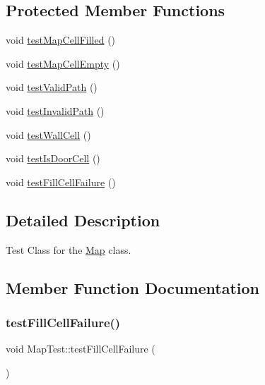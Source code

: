 \subsection*{Protected Member Functions}
\begin{DoxyCompactItemize}
\item 
void \hyperlink{classMapTest_a07e1aa96435351d15809b880ff7a7efb}{test\+Map\+Cell\+Filled} ()
\item 
void \hyperlink{classMapTest_a83bb3473f74089996c7f6bee8d59a97c}{test\+Map\+Cell\+Empty} ()
\item 
void \hyperlink{classMapTest_ae7a28d196c97101aa248a326af2a3f5b}{test\+Valid\+Path} ()
\item 
void \hyperlink{classMapTest_ad8823027d386c8d25f378d02adad120d}{test\+Invalid\+Path} ()
\item 
void \hyperlink{classMapTest_a577057c71af12efac9f1d6878bf85d01}{test\+Wall\+Cell} ()
\item 
void \hyperlink{classMapTest_a87e123f3f250492e1c444f0a3c8338b5}{test\+Is\+Door\+Cell} ()
\item 
void \hyperlink{classMapTest_a26099a50a62eec50694dba6e37bdfe22}{test\+Fill\+Cell\+Failure} ()
\end{DoxyCompactItemize}


\subsection{Detailed Description}
Test Class for the \hyperlink{classMap}{Map} class. 

\subsection{Member Function Documentation}
\hypertarget{classMapTest_a26099a50a62eec50694dba6e37bdfe22}{}\label{classMapTest_a26099a50a62eec50694dba6e37bdfe22} 
\subsubsection{\texorpdfstring{test\+Fill\+Cell\+Failure()}{testFillCellFailure()}}
{\footnotesize\ttfamily void Map\+Test\+::test\+Fill\+Cell\+Failure (\begin{DoxyParamCaption}{ }\end{DoxyParamCaption})\hspace{0.3cm}{\ttfamily [protected]}}

